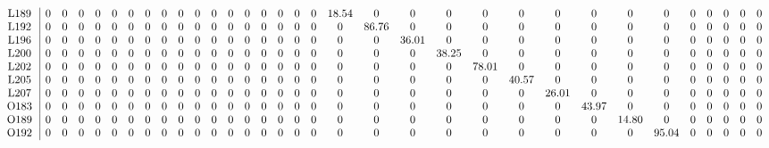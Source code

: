\begin{table}[H]
\begin{center}
\begin{math}
\begin{array}{c|cccccccccccccccccccccccccccccccc}
\mathrm{L189} \hspace*{2pt} &  0 &  0 &  0 &  0 &  0 &  0 &  0 &  0 &  0 &  0 &  0 &  0 &  0 &  0 &  0 &  0 &  0 &      18.54 &  0 &  0 &  0 &  0 &  0 &  0 &  0 &  0 &  0 &  0 &  0 &  0 &  0 &  0 \\
\mathrm{L192} \hspace*{2pt} &  0 &  0 &  0 &  0 &  0 &  0 &  0 &  0 &  0 &  0 &  0 &  0 &  0 &  0 &  0 &  0 &  0 &  0 &      86.76 &  0 &  0 &  0 &  0 &  0 &  0 &  0 &  0 &  0 &  0 &  0 &  0 &  0 \\
\mathrm{L196} \hspace*{2pt} &  0 &  0 &  0 &  0 &  0 &  0 &  0 &  0 &  0 &  0 &  0 &  0 &  0 &  0 &  0 &  0 &  0 &  0 &  0 &      36.01 &  0 &  0 &  0 &  0 &  0 &  0 &  0 &  0 &  0 &  0 &  0 &  0 \\
\mathrm{L200} \hspace*{2pt} &  0 &  0 &  0 &  0 &  0 &  0 &  0 &  0 &  0 &  0 &  0 &  0 &  0 &  0 &  0 &  0 &  0 &  0 &  0 &  0 &      38.25 &  0 &  0 &  0 &  0 &  0 &  0 &  0 &  0 &  0 &  0 &  0 \\
\mathrm{L202} \hspace*{2pt} &  0 &  0 &  0 &  0 &  0 &  0 &  0 &  0 &  0 &  0 &  0 &  0 &  0 &  0 &  0 &  0 &  0 &  0 &  0 &  0 &  0 &      78.01 &  0 &  0 &  0 &  0 &  0 &  0 &  0 &  0 &  0 &  0 \\
\mathrm{L205} \hspace*{2pt} &  0 &  0 &  0 &  0 &  0 &  0 &  0 &  0 &  0 &  0 &  0 &  0 &  0 &  0 &  0 &  0 &  0 &  0 &  0 &  0 &  0 &  0 &      40.57 &  0 &  0 &  0 &  0 &  0 &  0 &  0 &  0 &  0 \\
\mathrm{L207} \hspace*{2pt} &  0 &  0 &  0 &  0 &  0 &  0 &  0 &  0 &  0 &  0 &  0 &  0 &  0 &  0 &  0 &  0 &  0 &  0 &  0 &  0 &  0 &  0 &  0 &      26.01 &  0 &  0 &  0 &  0 &  0 &  0 &  0 &  0 \\
\mathrm{O183} \hspace*{2pt} &  0 &  0 &  0 &  0 &  0 &  0 &  0 &  0 &  0 &  0 &  0 &  0 &  0 &  0 &  0 &  0 &  0 &  0 &  0 &  0 &  0 &  0 &  0 &  0 &      43.97 &  0 &  0 &  0 &  0 &  0 &  0 &  0 \\
\mathrm{O189} \hspace*{2pt} &  0 &  0 &  0 &  0 &  0 &  0 &  0 &  0 &  0 &  0 &  0 &  0 &  0 &  0 &  0 &  0 &  0 &  0 &  0 &  0 &  0 &  0 &  0 &  0 &  0 &      14.80 &  0 &  0 &  0 &  0 &  0 &  0 \\
\mathrm{O192} \hspace*{2pt} &  0 &  0 &  0 &  0 &  0 &  0 &  0 &  0 &  0 &  0 &  0 &  0 &  0 &  0 &  0 &  0 &  0 &  0 &  0 &  0 &  0 &  0 &  0 &  0 &  0 &  0 &      95.04 &  0 &  0 &  0 &  0 &  0 \\

\end{array}
\end{math}
\end{center}
\end{table}
